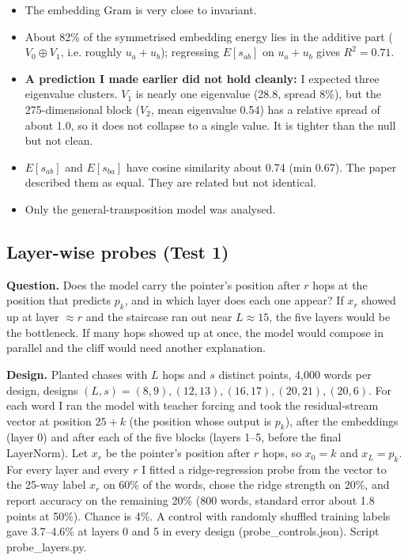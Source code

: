 \documentclass[paper=a4,fontsize=11pt,DIV=11,parskip=half,headings=small,numbers=noendperiod]{scrartcl}
\DeclareRobustCommand{\lead}[1]{\textsf{\bfseries\color{accent}#1}}
\DeclareRobustCommand{\code}[1]{{\fontseries{m}\ttfamily #1}}
\begin{document}
\begin{itemize}
\item The embedding Gram is very close to invariant.
\item About 82\% of the symmetrised embedding energy lies in the additive part ($V_0\oplus V_1$, i.e. roughly
  $u_a+u_b$); regressing $E[s_{ab}]$ on $u_a+u_b$ gives $R^2=0.71$.
\item \lead{A prediction I made earlier did not hold cleanly:} I expected three eigenvalue clusters. $V_1$ is
  nearly one eigenvalue (28.8, spread 8\%), but the 275-dimensional block ($V_2$, mean eigenvalue 0.54) has a
  relative spread of about 1.0, so it does not collapse to a single value. It is tighter than the null but not
  clean.
\item $E[s_{ab}]$ and $E[s_{ba}]$ have cosine similarity about 0.74 (min 0.67). The paper described them as
  equal. They are related but not identical.
\item Only the general-transposition model was analysed.
\end{itemize}

\subsection{Layer-wise probes (Test 1)}\label{sec:3.6}
\lead{Question.} Does the model carry the pointer’s position after $r$ hops at the position that predicts $p_k$,
and in which layer does each one appear? If $x_r$ showed up at layer $\approx r$ and the staircase ran out near
$L\approx 15$, the five layers would be the bottleneck. If many hops showed up at once, the model would compose
in parallel and the cliff would need another explanation.

\lead{Design.} Planted chases with $L$ hops and $s$ distinct points, 4,000 words per design, designs
$(L,s)=(8,9),(12,13),(16,17),(20,21),(20,6)$. For each word I ran the model with teacher forcing and took the
residual-stream vector at position $25+k$ (the position whose output is $p_k$), after the embeddings (layer 0)
and after each of the five blocks (layers 1–5, before the final LayerNorm). Let $x_r$ be the pointer’s position
after $r$ hops, so $x_0=k$ and $x_L=p_k$. For every layer and every $r$ I fitted a ridge-regression probe from
the vector to the 25-way label $x_r$ on 60\% of the words, chose the ridge strength on 20\%, and report accuracy
on the remaining 20\% (800 words, standard error about 1.8 points at 50\%). Chance is 4\%. A control with
randomly shuffled training labels gave 3.7–4.6\% at layers 0 and 5 in every design
(\code{probe\_\allowbreak{}controls.\allowbreak{}json}). Script
\code{probe\_\allowbreak{}layers.\allowbreak{}py}.
\end{document}
